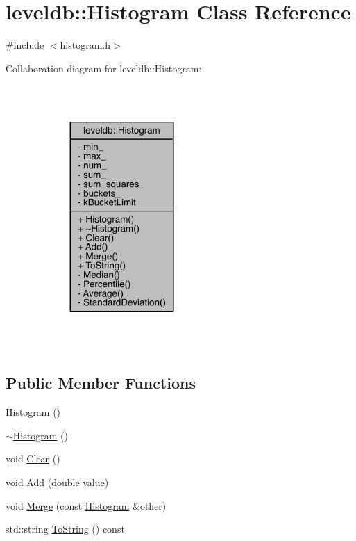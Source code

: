 \hypertarget{classleveldb_1_1_histogram}{}\section{leveldb\+:\+:Histogram Class Reference}
\label{classleveldb_1_1_histogram}


{\ttfamily \#include $<$histogram.\+h$>$}



Collaboration diagram for leveldb\+:\+:Histogram\+:\nopagebreak
\begin{figure}[H]
\begin{center}
\leavevmode
\includegraphics[width=191pt]{classleveldb_1_1_histogram__coll__graph}
\end{center}
\end{figure}
\subsection*{Public Member Functions}
\begin{DoxyCompactItemize}
\item 
\hyperlink{classleveldb_1_1_histogram_a2b4d29303598913c7021d077e5a8b10f}{Histogram} ()
\item 
\hyperlink{classleveldb_1_1_histogram_a3f6375d4ef50956a540262a3cf720f13}{$\sim$\+Histogram} ()
\item 
void \hyperlink{classleveldb_1_1_histogram_ab30a7e767693010656d90bfd361ecb91}{Clear} ()
\item 
void \hyperlink{classleveldb_1_1_histogram_a7dd7147b7f6548f0bebde25ca40e4457}{Add} (double value)
\item 
void \hyperlink{classleveldb_1_1_histogram_a22befd197208f0142b236917bcadf196}{Merge} (const \hyperlink{classleveldb_1_1_histogram}{Histogram} \&other)
\item 
std\+::string \hyperlink{classleveldb_1_1_histogram_a78fde129eef6d9072ff986afd18d1163}{To\+String} () const 
\end{DoxyCompactItemize}
